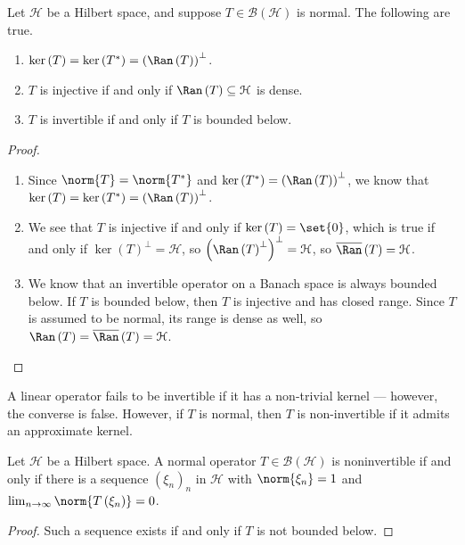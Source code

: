 \documentclass[10pt]{mypackage}
\begin{document}
\begin{proposition}
  Let $\mathcal{H}$ be a Hilbert space, and suppose $T\in \mathcal{B}\left(\mathcal{H}\right)$ is normal. The following are true.
  \begin{enumerate}[(1)]
    \item $\ker\left(T\right) = \ker\left(T^{\ast}\right) = \left(\Ran\left(T\right)\right)^{\perp}$.
    \item $T$ is injective if and only if $\Ran\left(T\right)\subseteq \mathcal{H}$ is dense.
    \item $T$ is invertible if and only if $T$ is bounded below.
  \end{enumerate}
\end{proposition}
\begin{proof}\hfill
  \begin{enumerate}[(1)]
    \item Since $\norm{T} = \norm{T^{\ast}}$ and $\ker\left(T^{\ast}\right) = \left(\Ran\left(T\right)\right)^{\perp}$, we know that $\ker\left(T\right) = \ker\left(T^{\ast}\right) = \left(\Ran\left(T\right)\right)^{\perp}$.
    \item We see that $T$ is injective if and only if $\ker\left(T\right) = \set{0}$, which is true if and only if $\ker\left(T\right)^{\perp} = \mathcal{H}$, so $\left(\Ran\left(T\right)^{\perp}\right)^{\perp} = \mathcal{H}$, so $\overline{\Ran}\left(T\right) = \mathcal{H}$.
    \item We know that an invertible operator on a Banach space is always bounded below. If $T$ is bounded below, then $T$ is injective and has closed range. Since $T$ is assumed to be normal, its range is dense as well, so $\Ran\left(T\right) = \overline{\Ran}\left(T\right) = \mathcal{H}$.
  \end{enumerate}
\end{proof}
A linear operator fails to be invertible if it has a non-trivial kernel --- however, the converse is false. However, if $T$ is normal, then $T$ is non-invertible if it admits an approximate kernel.
\begin{corollary}
  Let $\mathcal{H}$ be a Hilbert space. A normal operator $T\in \mathcal{B}\left(\mathcal{H}\right)$ is noninvertible if and only if there is a sequence $\left(\xi_n\right)_n$ in $\mathcal{H}$ with $\norm{\xi_n} = 1$ and $\lim_{n\rightarrow\infty}\norm{T\left(\xi_n\right)}=0$.
\end{corollary}
\begin{proof}
  Such a sequence exists if and only if $T$ is not bounded below.
\end{proof}
\end{document}
